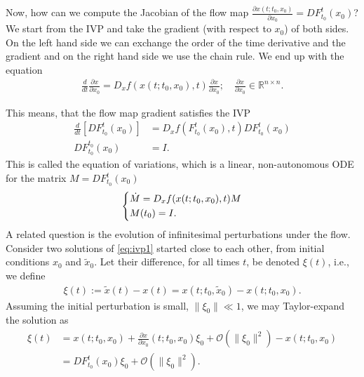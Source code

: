 Now, how can we compute the Jacobian of the flow map $\frac{\partial  {x}(t; t_0,  {x}_0)}{ \partial  {x}_0} = DF _{t_0}^{t}( {x}_0)$? We start from the IVP and take the gradient (with respect to $x_0$) of both sides. On the left hand side we can exchange the order of the time derivative and the gradient and on the right hand side we use the chain rule. We end up with the equation
\begin{align}
	\frac{d}{dt}\frac{\partial  {x}}{\partial  {x}_0} = D_ {x} f( {x}(t; t_0,  {x}_0), t) \frac{\partial  {x}}{\partial  {x}_0}; \quad \frac{\partial x}{\partial x_0} \in \mathbb{R}^{n \times n}.
\end{align}

This means, that the flow map gradient satisfies the IVP
\begin{subequations}\begin{align}
	\frac{d}{dt}\left[ DF_{t_0}^{t}( {x}_0)\right] &= D_{ {x}}f(F_{t_0}^{t}( {x}_0), t) DF_{t_0}^{t}( {x}_0) \\
	DF_{t_0}^{t_0}( {x}_0) &= I.
\end{align}\end{subequations}
This is called the equation of variations, which is a linear, non-autonomous ODE for the matrix $M = DF_{t_0}^{t}(x_0)$
\begin{align}
\label{eq:equation_of_variations}
	\begin{dcases}
		\dot{M} = D_ {x} f( {x}(t; t_0,  {x}_0), t) M \\ M(t_0) = I.
	\end{dcases}
\end{align}
A related question is the evolution of infinitesimal perturbations under the flow. Consider two solutions of \eqref{eq:ivp1} started close to each other, from initial conditions $x_0$ and $\tilde{x}_0$.  Let their difference, for all times $t$, be denoted $\xi(t)$, i.e., we define 
\begin{align}
	\label{eq:xi_definition}
		 {\xi}(t) := \tilde{ {x}}(t) -  {x}(t) =  {x}(t; t_0, \tilde{ {x}}_0) -  {x}(t; t_0,  {x}_0).
	\end{align}
	Assuming the initial perturbation is small, $ \| {\xi}_0 \| \ll 1$, we may Taylor-expand the solution as
	\begin{subequations}\begin{align}
			       {\xi}(t) &=  {x}(t; t_0,  {x}_0) + \frac{\partial  {x}}{\partial  {x}_0}(t; t_0,  {x}_0) {\xi}_0 + \mathcal{O}( \| {\xi}_0 \|^2) -  {x}(t; t_0,  {x}_0) \\
		       &= DF_{t_0}^{t}( {x}_0) {\xi}_0 + \mathcal{O}( \| {\xi}_0 \|^2).
		       \end{align}
	\end{subequations}
